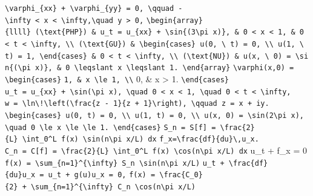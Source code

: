 \documentclass[
  ukrainian,
]{article}
\begin{document}
\texttt{\textbackslash{}varphi\_\{xx\}\ +\ \textbackslash{}varphi\_\{yy\}\ =\ 0,\ \textbackslash{}qquad\ -\textbackslash{}infty\ \textless{}\ x\ \textless{}\ \textbackslash{}infty,\textbackslash{}quad\ y\ \textgreater{}\ 0,}
\texttt{\textbackslash{}begin\{array\}\{llll\}\ (\textbackslash{}text\{PHP\})\ \&\ u\_t\ =\ u\_\{xx\}\ +\ \textbackslash{}sin\{(3\textbackslash{}pi\ x)\},\ \&\ 0\ \textless{}\ x\ \textless{}\ 1,\ \&\ 0\ \textless{}\ t\ \textless{}\ \textbackslash{}infty,\ \textbackslash{}\textbackslash{}\ (\textbackslash{}text\{GU\})\ \&\ \textbackslash{}begin\{cases\}\ u(0,\ \textbackslash{}\ t)\ =\ 0,\ \textbackslash{}\textbackslash{}\ u(1,\ \textbackslash{}\ t)\ =\ 1,\ \textbackslash{}end\{cases\}\ \&\ 0\ \textless{}\ t\ \textless{}\ \textbackslash{}infty,\ \textbackslash{}\textbackslash{}\ (\textbackslash{}text\{NU\})\ \&\ u(x,\ \textbackslash{}\ 0)\ =\ \textbackslash{}sin\{(\textbackslash{}pi\ x)\},\ \&\ 0\ \textbackslash{}leqslant\ x\ \textbackslash{}leqslant\ 1.\ \textbackslash{}end\{array\}}
\texttt{\textbackslash{}varphi(x,0)\ =}
\texttt{\textbackslash{}begin\{cases\}}
\texttt{1,\ \&\ \textbar{}x\textbar{}\ \textbackslash{}le\ 1,\ \textbackslash{}\textbackslash{}}
0, \& \textbar x\textbar{} \textgreater{} 1.
\texttt{\textbackslash{}end\{cases\}}
\texttt{u\_t\ =\ u\_\{xx\}\ +\ \textbackslash{}sin(\textbackslash{}pi\ x),\ \textbackslash{}quad\ 0\ \textless{}\ x\ \textless{}\ 1,\ \textbackslash{}quad\ 0\ \textless{}\ t\ \textless{}\ \textbackslash{}infty,}
\texttt{w\ =\ \textbackslash{}ln\textbackslash{}!\textbackslash{}left(\textbackslash{}frac\{z\ -\ 1\}\{z\ +\ 1\}\textbackslash{}right),\ \textbackslash{}qquad\ z\ =\ x\ +\ iy.}
\texttt{\textbackslash{}begin\{cases\}\ u(0,\ t)\ =\ 0,\ \textbackslash{}\textbackslash{}\ u(1,\ t)\ =\ 0,\ \textbackslash{}\textbackslash{}\ u(x,\ 0)\ =\ \textbackslash{}sin(2\textbackslash{}pi\ x),\ \textbackslash{}quad\ 0\ \textbackslash{}le\ x\ \textbackslash{}le\ \textbackslash{}le\ 1.\ \textbackslash{}end\{cases\}}
\texttt{S\_n\ =\ S{[}f{]}\ =\ \textbackslash{}frac\{2\}\{L\}\ \textbackslash{}int\_0\^{}L\ f(x)\ \textbackslash{}sin(n\textbackslash{}pi\ x/L)\ dx}
\texttt{f\_x=\textbackslash{}frac\{df\}\{du\}\textbackslash{},u\_x.}
\texttt{C\_n\ =\ C{[}f{]}\ =\ \textbackslash{}frac\{2\}\{L\}\ \textbackslash{}int\_0\^{}L\ f(x)\ \textbackslash{}cos(n\textbackslash{}pi\ x/L)\ dx}
u\_t + f\_x = 0
\texttt{f(x)\ =\ \textbackslash{}sum\_\{n=1\}\^{}\{\textbackslash{}infty\}\ S\_n\ \textbackslash{}sin(n\textbackslash{}pi\ x/L)}
\texttt{u\_t\ +\ \textbackslash{}frac\{df\}\{du\}u\_x\ =\ u\_t\ +\ g(u)u\_x\ =\ 0,}
\texttt{f(x)\ =\ \textbackslash{}frac\{C\_0\}\{2\}\ +\ \textbackslash{}sum\_\{n=1\}\^{}\{\textbackslash{}infty\}\ C\_n\ \textbackslash{}cos(n\textbackslash{}pi\ x/L)}
\end{document}
